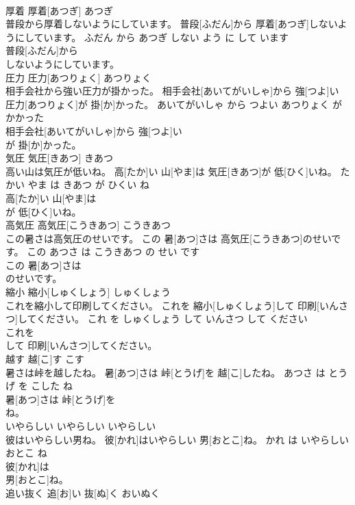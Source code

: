 \documentclass[8pt]{extreport}
\begin{document}
\begin{CJK}{UTF8}{min}
\\	厚着	厚着[あつぎ]	あつぎ	
\\	普段から厚着しないようにしています。	普段[ふだん]から 厚着[あつぎ]しないようにしています。	ふだん から あつぎ しない よう に して います	
\\	普段[ふだん]から
\\	しないようにしています。			
\\	圧力	圧力[あつりょく]	あつりょく	
\\	相手会社から強い圧力が掛かった。	相手会社[あいてがいしゃ]から 強[つよ]い 圧力[あつりょく]が 掛[か]かった。	あいてがいしゃ から つよい あつりょく が かかった	
\\	相手会社[あいてがいしゃ]から 強[つよ]い
\\	が 掛[か]かった。			
\\	気圧	気圧[きあつ]	きあつ	
\\	高い山は気圧が低いね。	高[たか]い 山[やま]は 気圧[きあつ]が 低[ひく]いね。	たかい やま は きあつ が ひくい ね	
\\	高[たか]い 山[やま]は
\\	が 低[ひく]いね。			
\\	高気圧	高気圧[こうきあつ]	こうきあつ	
\\	この暑さは高気圧のせいです。	この 暑[あつ]さは 高気圧[こうきあつ]のせいです。	この あつさ は こうきあつ の せい です	
\\	この 暑[あつ]さは
\\	のせいです。			
\\	縮小	縮小[しゅくしょう]	しゅくしょう	
\\	これを縮小して印刷してください。	これを 縮小[しゅくしょう]して 印刷[いんさつ]してください。	これ を しゅくしょう して いんさつ して ください	
\\	これを
\\	して 印刷[いんさつ]してください。			
\\	越す	越[こ]す	こす	
\\	暑さは峠を越したね。	暑[あつ]さは 峠[とうげ]を 越[こ]したね。	あつさ は とうげ を こした ね	
\\	暑[あつ]さは 峠[とうげ]を
\\	ね。			
\\	いやらしい	いやらしい	いやらしい	
\\	彼はいやらしい男ね。	彼[かれ]はいやらしい 男[おとこ]ね。	かれ は いやらしい おとこ ね	
\\	彼[かれ]は
\\	男[おとこ]ね。			
\\	追い抜く	追[お]い 抜[ぬ]く	おいぬく	

\end{CJK}
\end{document}
